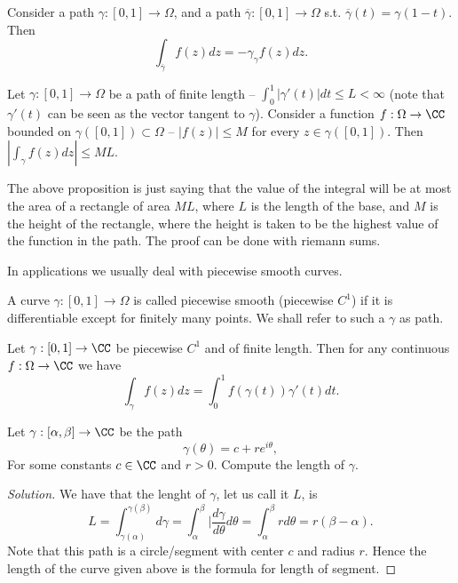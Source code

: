 \begin{proposition}
  Consider a path $\gamma:[0,1]\to\Omega$, and a path
  $\overline{\gamma}:[0,1]\to\Omega$ s.t. $\overline{\gamma}(t)=\gamma(1-t)$.
  Then
  \[\int_{\overline{\gamma}}f(z)dz = -\gamma_{\gamma}f(z)dz.\]
  \label{<+label+>}
\end{proposition}
\begin{proposition}
  Let $\gamma:[0,1]\to\Omega$ be a path of finite length -- $\int_0^1
  |\gamma'(t)|dt \leq L <\infty$ (note that $\gamma'(t)$ can be seen as the
  vector tangent to $\gamma$). Consider a function $f:\Omega\to\CC$ bounded on
  $\gamma([0,1])\subset\Omega$ -- $|f(z)|\leq M $ for every
  $z\in\gamma([0,1])$. Then $|\int_{\gamma} f(z) dz|\leq ML$.
  \label{prop:upperBoundIntegral}
\end{proposition}
The above proposition is just saying that the value of the integral will be at
most the area of a rectangle of area $ML$, where $L$ is the length of the base,
and $M$ is the height of the rectangle, where the height is taken to be the
highest value of the function in the path. The proof can be done with riemann
sums.

In applications we usually deal with piecewise smooth curves.
\begin{definition}
  A curve $\gamma:[0,1]\to\Omega$ is called piecewise smooth (piecewise $C^1$)
  if it is differentiable except for finitely many points. We shall refer to
  such a $\gamma$ as path.
\end{definition}

\begin{proposition}
  Let $\gamma:[0,1]\to\CC$ be piecewise $C^1$ and of finite length. Then for any
  continuous $f:\Omega\to\CC$ we have
  \[\int_{\gamma}f(z)dz = \int_{0}^1 f(\gamma(t))\gamma'(t) dt.\]
  \label{<+label+>}
\end{proposition}

\begin{example}
  Let $\gamma:[\alpha,\beta]\to\CC$ be the path 
  \[\gamma(\theta)=c+re^{i\theta},\]
  For some constants $c\in\CC$ and $r>0$. Compute the length of $\gamma$.
\end{example}
\begin{proof}[Solution]
  We have that the lenght of $\gamma$, let us call it $L$, is
  \[L= \int_{\gamma(\alpha)}^{\gamma(\beta)} d\gamma =  \int_{\alpha}^{\beta}
  |\frac{d\gamma}{d\theta}d\theta = \int_{\alpha}^{\beta} rd\theta =
  r(\beta-\alpha).\]
  Note that this path is a circle/segment with center $c$ and radius $r$. Hence
  the length of the curve given above is the formula for length of segment.
\end{proof}
